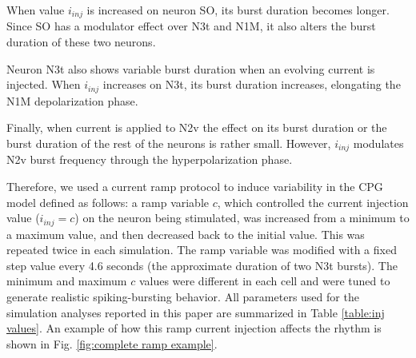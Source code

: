 When %
value \(i_{inj}\) is increased on neuron SO, its burst duration becomes longer. Since SO has a modulator effect over N3t and N1M, it also alters the burst duration of these two neurons.

Neuron N3t also shows variable burst duration when an evolving current is injected. When \(i_{inj}\) increases on N3t, its burst duration increases, elongating the N1M depolarization phase.  

Finally, when current is applied to N2v the effect on its burst duration or the burst duration of the rest of the neurons is rather small. However, \(i_{inj}\) %
modulates N2v burst frequency through the hyperpolarization phase. 

Therefore, we used a current ramp protocol to induce variability in the CPG model defined as follows: a ramp variable $c$, which controlled the current injection value ($i_{inj}=c$) %
on the neuron being stimulated, was increased from a minimum to a maximum value, and then decreased back to the initial value. This was repeated twice in each simulation. The ramp variable was modified with a fixed step value every 4.6 seconds (the approximate duration of two N3t bursts).
The minimum and maximum $c$ values were different in each cell and were %
tuned to generate realistic spiking-bursting behavior. %
All parameters used for the simulation analyses reported in this paper are summarized in Table \ref{table:inj values}. An example of how this ramp current injection affects the rhythm is shown in Fig. \ref{fig:complete ramp example}. 


